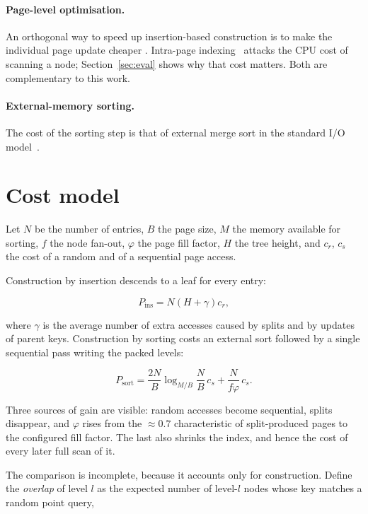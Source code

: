 \paragraph{Page-level optimisation.} An orthogonal way to speed up
insertion-based construction is to make the individual page update cheaper
\cite{borodin2017memory}. Intra-page indexing~\cite{borodin2019intrapage}
attacks the CPU cost of scanning a node; Section~\ref{sec:eval} shows why that
cost matters. Both are complementary to this work.

\paragraph{External-memory sorting.} The cost of the sorting step is that of
external merge sort in the standard I/O model~\cite{aggarwal1988io}.

\section{Cost model}
\label{sec:cost}

Let $N$ be the number of entries, $B$ the page size, $M$ the memory available
for sorting, $f$ the node fan-out, $\varphi$ the page fill factor, $H$ the tree
height, and $c_r$, $c_s$ the cost of a random and of a sequential page access.

Construction by insertion descends to a leaf for every entry:

\begin{equation}
\label{eq:ins}
P_{\text{ins}} = N\left(H + \gamma\right) c_r ,
\end{equation}

where $\gamma$ is the average number of extra accesses caused by splits and by
updates of parent keys. Construction by sorting costs an external sort followed
by a single sequential pass writing the packed levels:

\begin{equation}
\label{eq:sort}
P_{\text{sort}} = \frac{2N}{B}\log_{M/B}\frac{N}{B}\, c_s
                + \frac{N}{f\varphi}\, c_s .
\end{equation}

Three sources of gain are visible: random accesses become sequential, splits
disappear, and $\varphi$ rises from the $\approx 0.7$ characteristic of
split-produced pages to the configured fill factor. The last also shrinks the
index, and hence the cost of every later full scan of it.

The comparison is incomplete, because it accounts only for construction. Define
the \emph{overlap} of level $l$ as the expected number of level-$l$ nodes whose
key matches a random point query,

